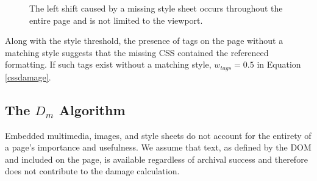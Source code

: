 \begin{figure}[h!]
  \begin{center}
    \qquad
  \end{center}
  \label{full}
  \caption{The left shift caused by a missing style sheet occurs throughout the entire page and is not limited to the viewport.}
\end{figure}


Along with the style threshold, the presence of tags on the page without a matching style suggests that the missing CSS contained the referenced formatting. If such tags exist without a matching style, $w_{tags}=0.5$ in Equation \ref{cssdamage}. 

\subsection{The $D_m$ Algorithm}
Embedded multimedia, images, and style sheets do not account for the entirety of a page's importance and usefulness. We assume that text, as defined by the DOM and included on the page, is available regardless of archival success and therefore does not contribute to the damage calculation.

